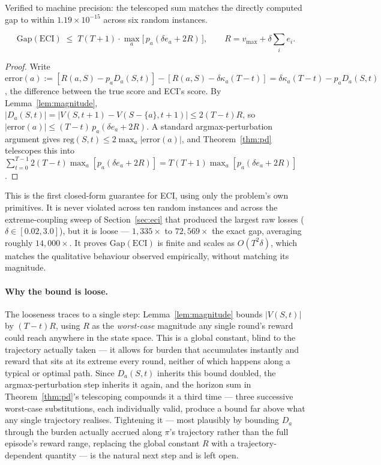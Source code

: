 Verified to machine precision: the telescoped sum matches the directly computed gap
to within $1.19\times 10^{-15}$ across six random instances.

\begin{theorem}
\label{thm:ecibound}
\[
\mathrm{Gap}(\mathrm{ECI}) \;\le\; T(T+1)\cdot \max_a\big[\, p_a(\delta e_a + 2R)
\,\big], \qquad R = v_{\max} + \delta\textstyle\sum_i e_i .
\]
\end{theorem}

\begin{proof}
Write $\mathrm{error}(a) := [R(a,S) - p_aD_a(S,t)] - [R(a,S) - \delta\kappa_a(T-t)]
= \delta\kappa_a(T-t) - p_aD_a(S,t)$, the difference between the true score and
ECI's score. By Lemma~\ref{lem:magnitude}, $|D_a(S,t)| = |V(S,t{+}1) -
V(S{-}\{a\},t{+}1)| \le 2(T-t)R$, so $|\mathrm{error}(a)| \le
(T-t)\,p_a(\delta e_a + 2R)$. A standard argmax-perturbation argument gives
$\mathrm{reg}(S,t) \le 2\max_a|\mathrm{error}(a)|$, and Theorem~\ref{thm:pd}
telescopes this into $\sum_{t=0}^{T-1} 2(T-t)\max_a[p_a(\delta e_a+2R)] =
T(T+1)\max_a[p_a(\delta e_a+2R)]$.
\end{proof}

This is the first closed-form guarantee for ECI, using only the problem's own
primitives. It is never violated across ten random instances and across the
extreme-coupling sweep of Section~\ref{sec:eci} that produced the largest raw
losses ($\delta \in [0.02, 3.0]$), but it is loose --- $1{,}335\times$ to
$72{,}569\times$ the exact gap, averaging roughly $14{,}000\times$. It proves
$\mathrm{Gap}(\mathrm{ECI})$ is finite and scales as $O(T^2\delta)$, which matches
the qualitative behaviour observed empirically, without matching its magnitude.

\paragraph{Why the bound is loose.} The looseness traces to a single step:
Lemma~\ref{lem:magnitude} bounds $|V(S,t)|$ by $(T-t)R$, using $R$ as the
\emph{worst-case} magnitude any single round's reward could reach anywhere in
the state space. This is a global constant, blind to the trajectory actually
taken --- it allows for burden that accumulates instantly and reward that sits
at its extreme every round, neither of which happens along a typical or optimal
path. Since $D_a(S,t)$ inherits this bound doubled, the argmax-perturbation step
inherits it again, and the horizon sum in
Theorem~\ref{thm:pd}'s telescoping compounds it a third time --- three
successive worst-case substitutions, each individually valid, produce a bound
far above what any single trajectory realises. Tightening it --- most plausibly
by bounding $D_a$ through the burden actually accrued along $\pi$'s trajectory
rather than the full episode's reward range, replacing the global constant $R$
with a trajectory-dependent quantity --- is the natural next step and is left
open.

